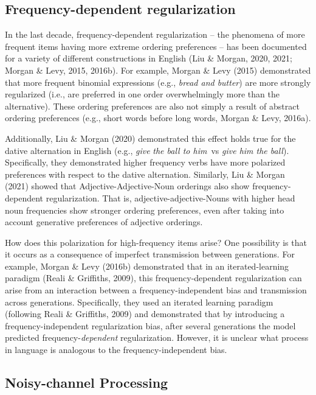 \documentclass[10pt, letterpaper]{article}
\begin{document}
\hypertarget{frequency-dependent-regularization}{%
\subsection{Frequency-dependent
regularization}\label{frequency-dependent-regularization}}

In the last decade, frequency-dependent regularization -- the phenomena
of more frequent items having more extreme ordering preferences -- has
been documented for a variety of different constructions in English (Liu
\& Morgan, 2020, 2021; Morgan \& Levy, 2015, 2016b). For example, Morgan
\& Levy (2015) demonstrated that more frequent binomial expressions
(e.g., \emph{bread and butter}) are more strongly regularized (i.e., are
preferred in one order overwhelmingly more than the alternative). These
ordering preferences are also not simply a result of abstract ordering
preferences (e.g., short words before long words, Morgan \& Levy,
2016a).

Additionally, Liu \& Morgan (2020) demonstrated this effect holds true
for the dative alternation in English (e.g., \emph{give} \emph{the ball
to him}~vs \emph{give him the ball}). Specifically, they demonstrated
higher frequency verbs have more polarized preferences with respect to
the dative alternation. Similarly, Liu \& Morgan (2021) showed that
Adjective-Adjective-Noun orderings also show frequency-dependent
regularization. That is, adjective-adjective-Nouns with higher head noun
frequencies show stronger ordering preferences, even after taking into
account generative preferences of adjective orderings.

How does this polarization for high-frequency items arise? One
possibility is that it occurs as a consequence of imperfect transmission
between generations. For example, Morgan \& Levy (2016b) demonstrated
that in an iterated-learning paradigm (Reali \& Griffiths, 2009), this
frequency-dependent regularization can arise from an interaction between
a frequency-independent bias and transmission across generations.
Specifically, they used an iterated learning paradigm (following Reali
\& Griffiths, 2009) and demonstrated that by introducing a
frequency-independent regularization bias, after several generations the
model predicted frequency-\emph{dependent} regularization. However, it
is unclear what process in language is analogous to the
frequency-independent bias.

\hypertarget{noisy-channel-processing}{%
\subsection{Noisy-channel Processing}\label{noisy-channel-processing}}
\end{document}
